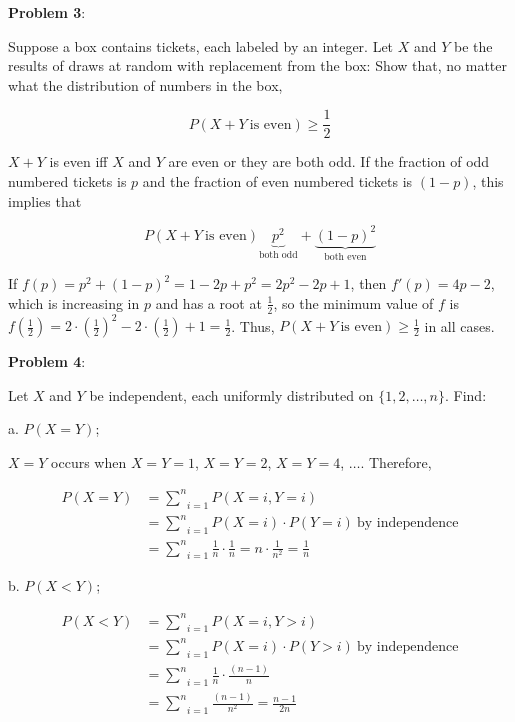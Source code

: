 \documentclass{article}
\begin{document}
\noindent\textbf{Problem 3}:

Suppose a box contains tickets, each labeled by an integer. Let $X$ and $Y$ be the results of draws at random with replacement from the box: Show that, no matter what the distribution of numbers in the box,

$$P(X+Y\ \text{is even})\ge\frac{1}{2}$$

{\color{blue}
$X+Y$ is even iff $X$ and $Y$ are even or they are both odd. If the fraction of odd numbered tickets is $p$ and the fraction of even numbered tickets is $(1-p)$, this implies that

$$P(X+Y\ \text{is even})\underbrace{p^2}_{\text{both odd}}+\underbrace{(1-p)^2}_{\text{both even}}$$

If $f(p)=p^2+(1-p)^2=1-2p+p^2=2p^2-2p+1$, then $f'(p)=4p-2$, which is increasing in $p$ and has a root at $\frac{1}{2}$, so the minimum value of $f$ is $f\left(\frac{1}{2}\right)=2\cdot\left(\frac{1}{2}\right)^2-2\cdot(\frac{1}{2})+1=\frac{1}{2}$. Thus, $P(X+Y\ \text{is even})\ge\frac{1}{2}$ in all cases.

}

\noindent\textbf{Problem 4}:

Let $X$ and $Y$ be independent, each uniformly distributed on $\{1,2,\ldots,n\}$. Find:

\indent\indent a. $P(X=Y)$;

{\color{blue}

$X=Y$ occurs when $X=Y=1$, $X=Y=2$, $X=Y=4$, $\ldots$. Therefore, 


\begin{align*}
P(X=Y)&=\underset{i=1}{\overset{n}{\sum}}P(X=i, Y=i)\\
&=\underset{i=1}{\overset{n}{\sum}}P(X=i)\cdot P(Y=i)\ \text{by independence}\\
&=\underset{i=1}{\overset{n}{\sum}}\frac{1}{n}\cdot\frac{1}{n}=n\cdot\frac{1}{n^2}=\frac{1}{n}
\end{align*}


}

\indent\indent b. $P(X<Y)$;

{\color{blue}


\begin{align*}
P(X<Y)&=\underset{i=1}{\overset{n}{\sum}}P(X=i,Y>i)\\
&=\underset{i=1}{\overset{n}{\sum}}P(X=i)\cdot P(Y>i)\ \text{by independence}\\
&=\underset{i=1}{\overset{n}{\sum}}\frac{1}{n}\cdot\frac{(n-1)}{n}\\
&=\underset{i=1}{\overset{n}{\sum}}\frac{(n-1)}{n^2}=\frac{n-1}{2n}
\end{align*}


}
\end{document}
